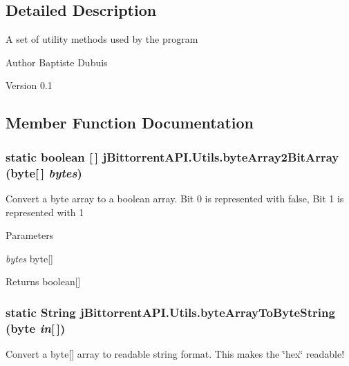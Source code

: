 \subsection{Detailed Description}
A set of utility methods used by the program

\begin{DoxyAuthor}{Author}
Baptiste Dubuis 
\end{DoxyAuthor}
\begin{DoxyVersion}{Version}
0.1 
\end{DoxyVersion}


\subsection{Member Function Documentation}
\hypertarget{classj_bittorrent_a_p_i_1_1_utils_a204e607231ce013be4ab1f9f67f7b30c}{
\subsubsection[{byteArray2BitArray}]{\setlength{\rightskip}{0pt plus 5cm}static boolean \mbox{[}$\,$\mbox{]} jBittorrentAPI.Utils.byteArray2BitArray (byte\mbox{[}$\,$\mbox{]} {\em bytes})}}
\label{classj_bittorrent_a_p_i_1_1_utils_a204e607231ce013be4ab1f9f67f7b30c}
Convert a byte array to a boolean array. Bit 0 is represented with false, Bit 1 is represented with 1 
\begin{DoxyParams}{Parameters}
\item[{\em bytes}]byte\mbox{[}\mbox{]} \end{DoxyParams}
\begin{DoxyReturn}{Returns}
boolean\mbox{[}\mbox{]} 
\end{DoxyReturn}
\hypertarget{classj_bittorrent_a_p_i_1_1_utils_a9490bfe75f951ccdf9bbda8b462d77b9}{
\subsubsection[{byteArrayToByteString}]{\setlength{\rightskip}{0pt plus 5cm}static String jBittorrentAPI.Utils.byteArrayToByteString (byte {\em in}\mbox{[}$\,$\mbox{]})}}
\label{classj_bittorrent_a_p_i_1_1_utils_a9490bfe75f951ccdf9bbda8b462d77b9}
Convert a byte\mbox{[}\mbox{]} array to readable string format. This makes the \char`\"{}hex\char`\"{} readable!

